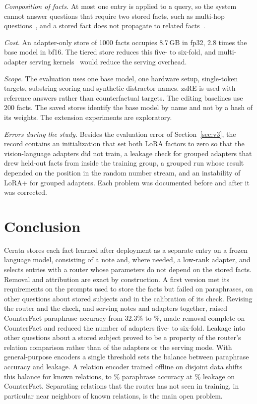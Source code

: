 \documentclass[journal,10pt]{IEEEtran}
\begin{document}
\emph{Composition of facts.} At most one entry is applied to a query, so the system
cannot answer questions that require two stored facts, such as multi-hop
questions~\cite{zhong2023mquake}, and a stored fact does not propagate to related
facts~\cite{cohen2024ripple}.

\emph{Cost.} An adapter-only store of 1000 facts occupies 8.7\,GB in fp32, 2.8 times the
base model in bf16. The tiered store reduces this five- to six-fold, and multi-adapter
serving kernels~\cite{sheng2024slora} would reduce the serving overhead.

\emph{Scope.} The evaluation uses one base model, one hardware setup, single-token
targets, substring scoring and synthetic distractor names. zsRE is used with reference
answers rather than counterfactual targets. The editing baselines use 200 facts. The saved
stores identify the base model by name and not by a hash of its weights. The extension
experiments are exploratory.

\emph{Errors during the study.} Besides the evaluation error of Section~\ref{sec:v3}, the
record contains an initialization that set both LoRA factors to zero so that the
vision-language adapters did not train, a leakage check for grouped adapters that drew
held-out facts from inside the training group, a grouped run whose result depended on the
position in the random number stream, and an instability of LoRA+ for grouped adapters.
Each problem was documented before and after it was corrected.

\section{Conclusion}

Cerata stores each fact learned after deployment as a separate entry on a frozen
language model, consisting of a note and, where needed, a low-rank adapter, and selects
entries with a router whose parameters do not depend on the stored facts. Removal and attribution are
exact by construction. A first version met its requirements on the prompts used to store
the facts but failed on paraphrases, on other questions about stored subjects and in the
calibration of its check. Revising the router and the check, and serving notes and
adapters together, raised CounterFact paraphrase accuracy from 32.3\% to
\vCfParaBothPct\%, made removal complete on CounterFact and reduced the number of
adapters five- to six-fold. Leakage into other questions about a stored subject proved to
be a property of the router's relation comparison rather than of the adapters or the
serving mode. With general-purpose encoders a single threshold sets
the balance between paraphrase accuracy and leakage. A relation encoder trained offline on
disjoint data shifts this balance for known relations, to \xCfParaBothPct\% paraphrase
accuracy at \xCfEthreeLeakBothPct\% leakage on CounterFact. Separating relations that the
router has not seen in training, in particular near neighbors of known relations, is the
main open problem.
\end{document}
